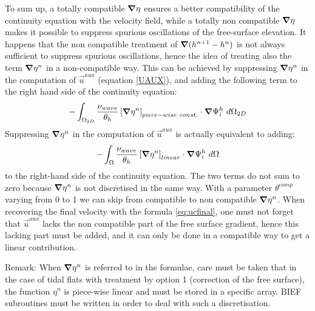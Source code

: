 To sum up, a totally compatible $\bm{\nabla}\eta$ ensures
a better compatibility of the continuity equation with the velocity field,
while a totally non compatible $\bm{\nabla}\eta$ makes it
possible to suppress spurious oscillations of the free-surface elevation.
It happens that the non compatible treatment of $\bm{\nabla}(h^{n+1}-h^{n})$ is
not always sufficient to suppress spurious oscillations, hence the
idea of treating also the term $\bm{\nabla} \eta^{n}$ in a non-compatible way.
This can be achieved by suppressing $\bm{\nabla} \eta^{n}$ in the computation
of $\vec{u}^{aux}$ (equation \eqref{UAUX}), and adding the following term to
the right hand side of the continuity equation:
\begin{equation}
-\int_{\Omega_{2D}}\dfrac{\nu_{wave}}{\theta_{h}}\left[\bm{\nabla}\eta^{n}\right]_{piece-wise~const.}\cdot\bm{\nabla}\Psi_{i}^{h}~d\Omega_{2D}
\end{equation}
Suppressing $\bm{\nabla}\eta^{n}$ in the computation of $\vec{u}^{aux}$
is actually equivalent to adding:
\begin{equation}
-\int_{\Omega}\dfrac{\nu_{wave}}{\theta_{h}}\left[\bm{\nabla}\eta^{n}\right]_{linear}
\cdot\bm{\nabla}\Psi_{i}^{h}~d\Omega
\end{equation}
to the right-hand side of the continuity equation. The two terms do not sum to
zero because $\bm{\nabla}\eta^{n}$ is not discretised in the same
way. With a parameter $\theta^{comp}$ varying from 0 to
1 we can skip from compatible to non compatible $\bm{\nabla}\eta^{n}$.
When recovering the final velocity with the formula
\eqref{eq:ucfinal}, one must not forget that $\vec{u}^{aux}$ lacks
the non compatible part of the free surface gradient, hence this lacking part
must be added, and it can only be done in a compatible way to get a
linear contribution.\\

\begin{CommentBlock}{Remark:}
When $\bm{\nabla}\eta^{n}$ is referred to in the formulae, care must
be taken that in the case of tidal flats with treatment by option 1
(correction of the free surface), the function $\eta^{n}$ is piece-wise linear
and must be stored in a specific array. BIEF subroutines must be written in
order to deal with such a discretisation.
\end{CommentBlock}


